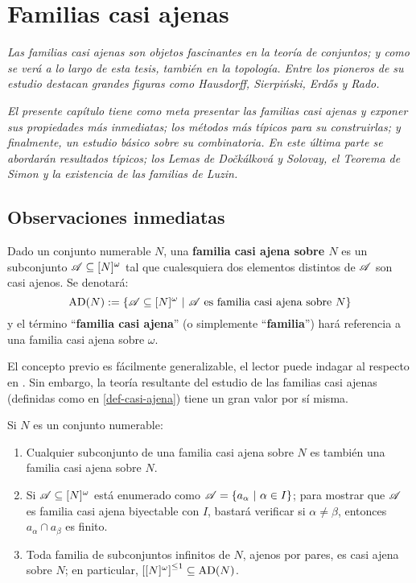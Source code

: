 \chapter{Familias casi ajenas}
 \emph{\small Las familias casi ajenas son objetos fascinantes en la teoría de conjuntos; y como se verá a lo largo de esta tesis, también en la topología. Entre los pioneros de su estudio destacan grandes figuras como Hausdorff, Sierpiński, Erdős y Rado.}

 \emph{\small El presente capítulo tiene como meta presentar las familias casi ajenas y exponer sus propiedades más inmediatas; los métodos más típicos para su construirlas; y finalmente, un estudio  básico sobre su combinatoria. En este última parte se abordarán resultados típicos; los Lemas de Dočkálková y Solovay, el Teorema de Simon y la existencia de las familias de Luzin.}

 \section{Observaciones inmediatas}

 \begin{definicion}\label{def-casi-ajena}
  Dado un conjunto numerable $N$, una \textbf{familia casi ajena sobre $N$} es un subconjunto $\mathscr{A}\subseteq[N]^\omega$ tal que cualesquiera dos elementos distintos de $\mathscr{A}$ son casi ajenos. Se denotará:
  $$ \operatorname{AD}(N):=\{ \mathscr{A} \subseteq [N]^\omega \text{ $|$ } \mathscr{A} \text{ es familia casi ajena sobre } N \} $$
  y el término ``\textbf{familia casi ajena}'' (o simplemente ``\textbf{familia}'') hará referencia a una familia casi ajena sobre $\omega$.
 \end{definicion}

 El concepto previo es fácilmente generalizable, el lector puede indagar al respecto en \cite[Def.~9.20, p.~118]{jechSet}. Sin embargo, la teoría resultante del estudio de las familias casi ajenas (definidas como en \ref{def-casi-ajena}) tiene un gran valor por sí misma.

 \begin{observacion}
  Si $N$ es un conjunto numerable:
  \begin{enumerate}
   \item Cualquier subconjunto de una familia casi ajena sobre $N$ es también una familia casi ajena sobre $N$.
   \item Si $\mathscr{A} \subseteq [N]^\omega$ está enumerado como $\mathscr{A} =\{ a_\alpha \text{ $|$ } \alpha \in I \}$; para mostrar que $\mathscr{A}$ es familia casi ajena biyectable con $I$, bastará verificar si $\alpha \neq \beta$, entonces $a_\alpha \cap a_\beta$ es finito.
   \item Toda familia de subconjuntos infinitos de $N$, ajenos por pares, es casi ajena sobre $N$; en particular, $\left[ [N]^\omega \right]^{\leq 1} \subseteq \operatorname{AD}(N)$.
  \end{enumerate}
 \end{observacion}

